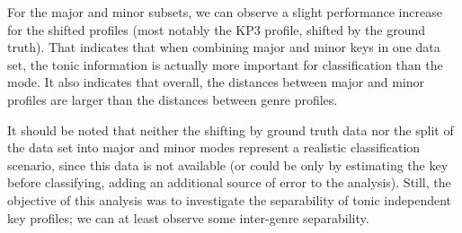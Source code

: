 \documentclass{article}
\begin{document}
For the major and minor subsets, we can observe a slight performance increase for the shifted profiles (most notably the KP3 profile, shifted by the ground truth). That indicates that when combining major and minor keys in one data set, the tonic information is actually more important for classification than the mode. It also indicates that overall, the distances between major and minor profiles are larger than the distances between genre profiles. 

It should be noted that neither the shifting by ground truth data nor the split of the data set into major and minor modes represent a realistic classification scenario, since this data is not available (or could be only by estimating the key before classifying, adding an additional source of error to the analysis). 
Still, the objective of this analysis was to investigate the separability of tonic independent key profiles; we can at least observe some inter-genre separability.





\end{document}
